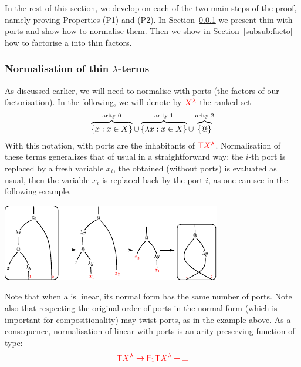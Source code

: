  In the rest of this section, we develop on each of the two main steps of the proof, namely proving Properties (P1) and (P2).  In Section~\ref{subsub:thin} we present thin \lambdaterms with ports and show how to normalise them. Then we show in Section~\ref{subsub:facto} how to factorise a \lambdaterm into thin factors. 
 

\subsubsection{Normalisation of thin $\lambda$-terms}\label{subsub:thin}

As discussed earlier, we will need to normalise \lambdaterms with ports (the factors of our factorisation). In the following, we will denote by ${\color{red}{{\color{red}{{X}^{{\color{red}{\lambda}}}}}}}$ the ranked set 
\begin{align*}
     \overbrace{\{x : x \in X\}}^{\text{arity 0}} \cup \overbrace{\{\lambda x : x \in X\}}^{\text{arity 1}} \cup  \overbrace{\{@\}}^{\text{arity 2}}
\end{align*}
With this notation, \lambdaterms with ports are the inhabitants of ${\color{red}{{\color{red}{\mathsf T}}{\color{red}{{X}^{{\color{red}{\lambda}}}}}}}$. Normalisation of these terms generalizes that of usual \lambdaterms in a straightforward way: the $i$-th port is replaced by a fresh variable $x_i$, the obtained \lambdaterm (without ports) is evaluated as usual, then the variable $x_i$ is replaced back by the port $i$, as one can see in the following example.  
  \begin{center}
\includegraphics[scale=1.2]{pictures/normalization-with-ports.pdf}
\end{center}
  Note that when a \lambdaterm is linear, its normal form has the same number of ports. Note also that respecting the original order of ports in the normal form (which is important for compositionality) may twist ports, as in the example above. As a consequence, normalisation of linear \lambdaterms with ports is an arity preserving function of  type:
  \begin{align*}
  {\color{red}{{\color{red}{\mathsf T}}{\color{red}{{X}^{{\color{red}{\lambda}}}}} \to {\color{red}{\mathsf F_{1}}}{\color{red}{\mathsf T}}{\color{red}{{X}^{{\color{red}{\lambda}}}}} +\bot}} 
  \end{align*}
   
